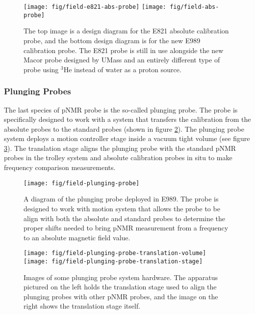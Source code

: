 \begin{figure}
\label{fig:field-e821-abs-probe}
\centering
\texttt{[image: fig/field-e821-abs-probe]}
\texttt{[image: fig/field-abs-probe]}
\caption{The top image is a design diagram for the E821 absolute calibration probe, and the bottom design diagram is for the new E989 calibration probe.  The E821 probe is still in use alongside the new Macor probe designed by UMass and an entirely different type of probe using $\mathrm{^3He}$ instead of water as a proton source.}
\end{figure}

\subsubsection{Plunging Probes}

The last species of pNMR probe is the so-called plunging probe. The probe is specifically designed to work with a system that transfers the calibration from the absolute probes to the standard probes (shown in figure \ref{fig:field-plunging-probe}).  The plunging probe system deploys a motion controller stage inside a vacuum tight volume (see figure \ref{fig:field-plunging-probe-translation-stage}).  The translation stage aligns the plunging probe with the standard pNMR probes in the trolley system and absolute calibration probes in situ to make frequency comparison measurements.

\begin{figure}
\label{fig:field-plunging-probe}
\centering
\texttt{[image: fig/field-plunging-probe]}
\caption{A diagram of the plunging probe deployed in E989.  The probe is designed to work with motion system that allows the probe to be align with both the absolute and standard probes to determine the proper shifts needed to bring pNMR measurement from a frequency to an absolute magnetic field value.}
\end{figure}

\begin{figure}
\label{fig:field-plunging-probe-translation-stage}
\centering
\texttt{[image: fig/field-plunging-probe-translation-volume]}
\texttt{[image: fig/field-plunging-probe-translation-stage]}
\caption{Images of some plunging probe system hardware.  The apparatus pictured on the left holds the translation stage used to align the plunging probes with other pNMR probes, and the image on the right shows the translation stage itself.}
\end{figure}

